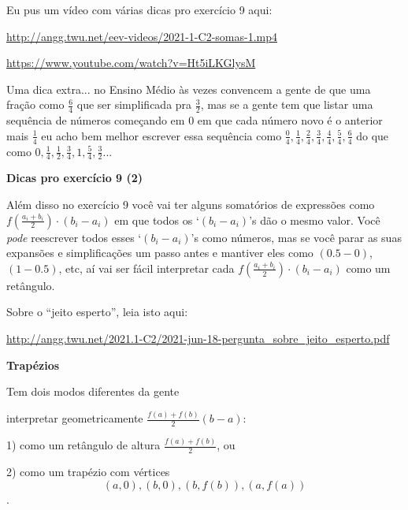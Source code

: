 \documentclass[oneside,12pt]{article}
\begin{document}
Eu pus um vídeo com várias dicas pro exercício 9 aqui:

\ssk


\url{http://angg.twu.net/eev-videos/2021-1-C2-somas-1.mp4}

\url{https://www.youtube.com/watch?v=Ht5iLKGlysM}

\msk

Uma dica extra... no Ensino Médio às vezes convencem a gente de que
uma fração como $\frac64$  que
ser simplificada pra $\frac32$, mas se a gente tem que listar uma
sequência de números começando em 0 em que cada número novo é o
anterior mais $\frac14$ eu acho bem melhor escrever essa sequência
como $\frac04, \frac14, \frac24, \frac34, \frac44, \frac54, \frac64$
do que como $0, \frac14, \frac12, \frac34, 1, \frac54, \frac32$...

\newpage

{\bf Dicas pro exercício 9 (2)}

Além disso no exercício 9 você vai ter alguns somatórios de expressões
como $f(\frac{a_i+b_i}{2})·(b_i-a_i)$ em que todos os `$(b_i-a_i)$'s
dão o mesmo valor. Você {\sl pode} reescrever todos esses
`$(b_i-a_i)$'s como números, mas se você parar as suas expansões e
simplificações um passo antes e mantiver eles como $(0.5 - 0)$, $(1 -
0.5)$, etc, aí vai ser fácil interpretar cada
$f(\frac{a_i+b_i}{2})·(b_i-a_i)$ como um retângulo.


\bsk

Sobre o ``jeito esperto'', leia isto aqui:

\ssk

{\scriptsize

\url{http://angg.twu.net/2021.1-C2/2021-jun-18-pergunta_sobre_jeito_esperto.pdf}

}



\newpage


{\bf Trapézios}

Tem dois modos diferentes da gente

interpretar geometricamente $\frac{f(a)+f(b)}{2} (b-a)$:

\msk

1) como um retângulo de altura $\frac{f(a)+f(b)}{2}$, ou

2) como um trapézio com vértices
%
$$(a,0), (b,0), (b,f(b)), (a,f(a))$$.
\end{document}
